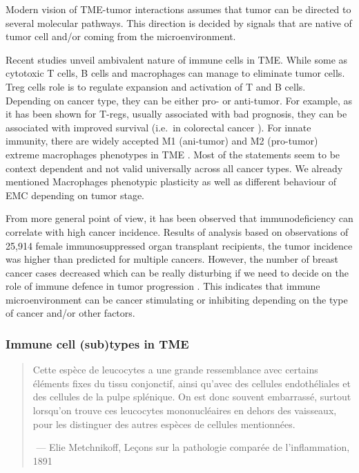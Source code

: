 \documentclass[12pt,]{book}
\theoremstyle{definition}
\theoremstyle{definition}
\theoremstyle{definition}
\theoremstyle{remark}
\begin{document}
Modern vision of TME-tumor interactions assumes that tumor can be
directed to several molecular pathways. This direction is decided by
signals that are native of tumor cell and/or coming from the
microenvironment.

Recent studies unveil ambivalent nature of immune cells in TME. While
some as cytotoxic T cells, B cells and macrophages can manage to
eliminate tumor cells. Treg cells role is to regulate expansion and
activation of T and B cells. Depending on cancer type, they can be
either pro- or anti-tumor. For example, as it has been shown for T-regs,
usually associated with bad prognosis, they can be associated with
improved survival (i.e.~in colorectal cancer \citep{Frey2010}). For
innate immunity, there are widely accepted M1 (ani-tumor) and M2
(pro-tumor) extreme macrophages phenotypes in TME \citep{Qian2010}. Most
of the statements seem to be context dependent and not valid universally
across all cancer types. We already mentioned Macrophages phenotypic
plasticity as well as different behaviour of EMC depending on tumor
stage.

From more general point of view, it has been observed that
immunodeficiency can correlate with high cancer incidence. Results of
analysis based on observations of 25,914 female immunosuppressed organ
transplant recipients, the tumor incidence was higher than predicted for
multiple cancers. However, the number of breast cancer cases decreased
which can be really disturbing if we need to decide on the role of
immune defence in tumor progression \citep{Stewart1995}. This indicates
that immune microenvironment can be cancer stimulating or inhibiting
depending on the type of cancer and/or other factors.

\hypertarget{immune-cell-subtypes-in-tme}{%
\subsubsection{Immune cell (sub)types in
TME}\label{immune-cell-subtypes-in-tme}}

\begin{quote}
Cette espèce de leucocytes a une grande ressemblance avec certains
éléments fixes du tissu conjonctif, ainsi qu'avec des cellules
endothéliales et des cellules de la pulpe splénique. On est donc souvent
embarrassé, surtout lorsqu'on trouve ces leucocytes mononucléaires en
dehors des vaisseaux, pour les distinguer des autres espèces de cellules
mentionnées.

​ --- Elie Metchnikoff, Leçons sur la pathologie comparée de
l'inflammation, 1891
\end{quote}
\end{document}
